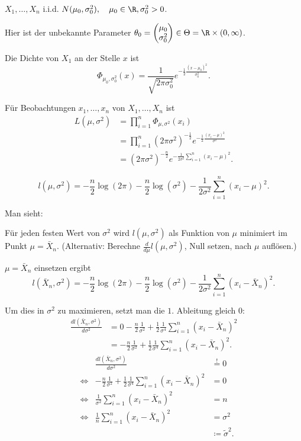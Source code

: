 \documentclass{tstextbook}
\begin{document}
\begin{example}
	$ X_1,\ldots,X_n $ i.i.d. $ N(\mu_0,\sigma_0^2), \quad \mu_0 \in \R, \sigma_0^2 > 0 $. 
	
	Hier ist der unbekannte Parameter $ \theta_0 = \begin{pmatrix}
		\mu_0 \\ \sigma_0^2
	\end{pmatrix} \in \Theta = \R \times (0,\infty) $.
	
	Die Dichte von $ X_1 $ an der Stelle $ x $ ist 
	\[
	\Phi_{\mu_0,\sigma_0^2}(x) = \frac{1}{\sqrt{2\pi\sigma_0^2}} e^{-\frac{1}{2}\frac{(x-\mu_0)^2}{\sigma_0^2}}.
	\]
	
	Für Beobachtungen $ x_1, \ldots, x_n $ von $ X_1,\ldots,X_n $ ist 
	\[
	\begin{aligned}
		L\left(\mu,\sigma^2\right) & = \prod_{i=1}^{n} \Phi_{\mu,\sigma^2}(x_i) \\
		& = \prod_{i=1}^{n} (2\pi\sigma^2)^{-\frac{1}{2}} e^{-\frac{1}{2}\frac{(x_i-\mu)^2}{\sigma^2}} \\
		& = (2\pi\sigma^2)^{-\frac{n}{2}} e^{-\frac{1}{2\sigma^2}\sum_{i=1}^{n}(x_i-\mu)^2}.
	\end{aligned}
	\]
	
	\[
	l\left(\mu,\sigma^2\right) = -\frac{n}{2}\log(2\pi)-\frac{n}{2}\log(\sigma^2)-\frac{1}{2\sigma^2}\sum_{i=1}^{n}(x_i-\mu)^2.
	\]
	
	Man sieht:
	
	Für jeden festen Wert von $ \sigma^2 $ wird $ l\left(\mu,\sigma^2\right) $ als Funktion von $ \mu $ minimiert im Punkt $ \mu = \bar{X}_n $. (Alternativ: Berechne $ \frac{d}{d\mu}l\left(\mu,\sigma^2\right) $, Null setzen, nach $ \mu $ auflösen.)
	
	$ \mu = \bar{X}_n $ einsetzen ergibt 
	\[
	l\left(\bar{X}_n,\sigma^2\right) = -\frac{n}{2}\log(2\pi)-\frac{n}{2}\log(\sigma^2)-\frac{1}{2\sigma^2}\sum_{i=1}^{n}(x_i-\bar{X}_n)^2.
	\]
	
	Um dies in $ \sigma^2 $ zu maximieren, setzt man die $ 1. $ Ableitung gleich $ 0 $:
	\[
	\begin{aligned}
		\frac{dl\left(\bar{X}_n,\sigma^2\right)}{d\sigma^2} & = 0-\frac{n}{2}\frac{1}{\sigma^2}+\frac{1}{2}\frac{1}{\sigma^4}\sum_{i=1}^{n}(x_i-\bar{X}_n)^2 \\
		& = -\frac{n}{2}\frac{1}{\sigma^2}+\frac{1}{2}\frac{1}{\sigma^4}\sum_{i=1}^{n}(x_i-\bar{X}_n)^2.
	\end{aligned}
	\]
	\[
	\begin{aligned}
		&& \frac{dl\left(\bar{X}_n,\sigma^2\right)}{d\sigma^2} & \overset{!}{=} 0 \\
		&\Leftrightarrow& -\frac{n}{2}\frac{1}{\sigma^2}+\frac{1}{2}\frac{1}{\sigma^4}\sum_{i=1}^{n}(x_i-\bar{X}_n)^2 & = 0 \\
		&\Leftrightarrow& \frac{1}{\sigma^2}\sum_{i=1}^{n}(x_i-\bar{X}_n)^2 & = n \\
		&\Leftrightarrow& \frac{1}{n}\sum_{i=1}^{n}(x_i-\bar{X}_n)^2 & = \sigma^2 \\
		& & & \coloneqq \tilde{\sigma}^2.
	\end{aligned}
	\]
	

\end{example}
\end{document}
